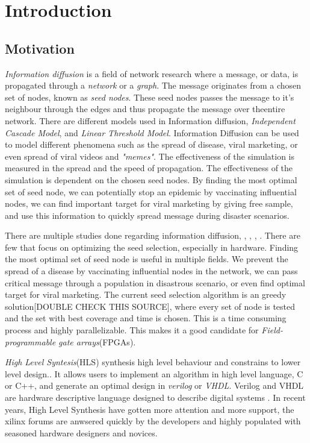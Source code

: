 \chapter{Introduction} \label{intro}

\section{Motivation}
\textit{Information diffusion} is a field of network research where a message, or data, is propagated through a \textit{network} or a \textit{graph}. The message originates from a chosen set of nodes, known as \textit{seed nodes}. These seed nodes passes the message to it's neighbour through the edges and thus propagate the message over theentire network. There are different models used in Information diffusion, \textit{Independent Cascade Model}, and \textit{Linear Threshold Model}. Information Diffusion can be used to model different phenomena such as the spread of disease, viral marketing, or even spread of viral videos and \textit{"memes"}\cite{InformationDiffusionThroughBlogspace}. The effectiveness of the simulation is measured in the spread and the speed of propagation. The effectiveness of the simulation is dependent on the chosen seed nodes. By finding the most optimal set of seed node, we can potentially stop an epidemic by vaccinating influential nodes, we can find important target for viral marketing by giving free sample, and use this information to quickly spread message during disaster scenarios.

There are multiple studies done regarding information diffusion, \cite{cha2010measuring}, \cite{InformationDiffusionThroughBlogspace}, \cite{5694014},  \cite{InfoDiffAndExternalInfluInNetworks}. There are  few that focus on optimizing the seed selection, especially in hardware. Finding the most optimal set of seed node is useful in multiple fields. We prevent the spread of a disease by vaccinating influential nodes in the network, we can pass critical message through a population in disastrous scenario, or even find optimal target for viral marketing.  The current seed selection algorithm is an greedy solution\cite{greedyInfluenc2005}[DOUBLE CHECK THIS SOURCE], where every set of node is tested and the set with best coverage and time is chosen. This is a time consuming process and highly parallelizable. This makes it a good candidate for \textit{Field-programmable gate arrays}(FPGAs). 

\textit{High Level Syntesis}(HLS) synthesis high level behaviour and constrains to lower level design.\cite{52214}. It allows users to implement an algorithm in high level language, C or C++, and generate an optimal design in \textit{verilog} or \textit{VHDL}. Verilog and VHDL are hardware descriptive language designed to describe digital systems \cite{thomas2008verilog}. In recent years, High Level Synthesis have gotten more attention and more support, the xilinx forums are anwsered quickly by the developers and highly populated with seasoned hardware designers and novices. 

